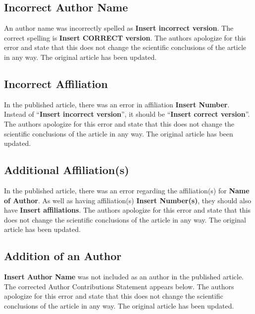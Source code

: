 \documentclass[utf8]{frontiers_correction}
\begin{document}

\subsection*{Incorrect Author Name}
An author name was incorrectly spelled as \textbf{Insert incorrect version}. The correct spelling is \textbf{Insert CORRECT version}. The authors apologize for this error and state that this does not change the scientific conclusions of the article in any way. The original article has been updated.

\subsection*{Incorrect Affiliation}
In the published article, there was an error in affiliation \textbf{Insert Number}. Instead of “\textbf{Insert incorrect version}”, it should be “\textbf{Insert correct version}”. The authors apologize for this error and state that this does not change the scientific conclusions of the article in any way. The original article has been updated.

\subsection*{Additional Affiliation(s)}
In the published article, there was an error regarding the affiliation(s) for \textbf{Name of Author}. As well as having affiliation(s) \textbf{Insert Number(s)}, they should also have \textbf{Insert affiliations}. The authors apologize for this error and state that this does not change the scientific conclusions of the article in any way. The original article has been updated.

\subsection*{Addition of an Author}
\textbf{Insert Author Name} was not included as an author in the published article. The corrected Author Contributions Statement appears below. The authors apologize for this error and state that this does not change the scientific conclusions of the article in any way. The original article has been updated.
\end{document}
